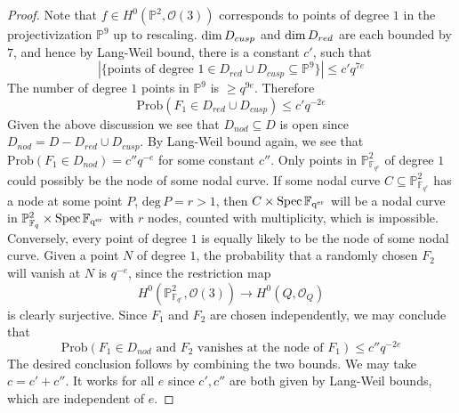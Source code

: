 \documentclass[12pt]{article}
\theoremstyle{plain}
\theoremstyle{definition}
\newcommand{\IF}{\mathbb{F}}
\newcommand{\IP}{\mathbb{P}}
\newcommand{\sO}{\mathcal{O}}
\renewcommand{\deg}{\mathrm{deg}\,}
\newcommand{\Spec}{\rm Spec\,}
\renewcommand\dim{{\rm dim\,}}
\newcommand{\<}{\langle}
\renewcommand{\>}{\rangle}
\newcommand{\Prob}{\mathrm{Prob}}
\begin{document}
\begin{proof}
Note that $f \in H^0(\IP^2, \sO(3))$ corresponds to points of degree $1$ in the projectivization $\IP^9$ up to rescaling. 
$\dim D_{cusp}$ and $\dim D_{red}$ are each bounded by $7$, and hence by Lang-Weil bound, there is a constant $c'$, such that 
$$ |\{ \text{points of degree }1 \in D_{red} \cup D_{cusp} \subseteq \IP^9\}| \le c'q^{7e} $$ 
The number of degree $1$ points in $\IP^9$ is $\ge q^{9e}$. Therefore $$\Prob(F_1 \in D_{red} \cup D_{cusp}) \le c' q^{-2e}$$
Given the above discussion we see that $D_{nod} \subseteq D$ is open since $D_{nod} = D - D_{red} \cup D_{cusp}$. By Lang-Weil bound again, we see that $\Prob(F_1 \in D_{nod}) = c'' q^{-e}$ for some constant $c''$. Only points in $\IP^2_{\IF_{q^e}}$ of degree $1$ could possibly be the node of some nodal curve. If some nodal curve $C \subseteq \IP^2_{\IF_{q^e}}$ has a node at some point $P$, $\deg P  = r > 1$, then $C \times \Spec \IF_{q^{er}} $ will be a nodal curve in $\IP^2_{\IF_q} \times \Spec \IF_{q^{er}}$ with $r$ nodes, counted with multiplicity, which is impossible. Conversely, every point of degree $1$ is equally likely to be the node of some nodal curve. Given a point $N$ of degree $1$, the probability that a randomly chosen $F_2$ will vanish at $N$ is $q^{-e}$, since the restriction map
$$ H^0(\IP^2_{\IF_{q^e}}, \sO(3)) \to H^0(Q, \sO_Q) $$
is clearly surjective. Since $F_1$ and $F_2$ are chosen independently, we may conclude that 
$$ \Prob(F_1 \in D_{nod} \text{ and } F_2 \text{ vanishes at the node of }F_1 ) \le c'' q^{-2e}$$
The desired conclusion follows by combining the two bounds. We may take $c = c' + c''$. It works for all $e$ since $c', c''$ are both given by Lang-Weil bounds, which are independent of $e$. 
\end{proof}
\end{document}
